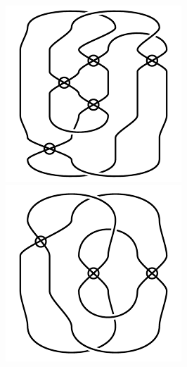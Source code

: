 \begin{figure}[H]
\begin{minipage}[b]{.18\linewidth}
\end{minipage}
\begin{minipage}[b]{.18\linewidth}
\centering
\includegraphics[width=\linewidth]{../data/virtual_4_89.png}
\end{minipage}
\begin{minipage}[b]{.18\linewidth}
\centering
\includegraphics[width=\linewidth]{../data/virtual_4_90.png}

\end{minipage}
\end{figure}
